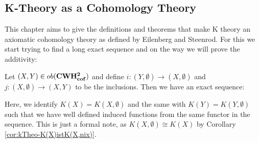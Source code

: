 \subsection{K-Theory as a Cohomology Theory}
This chapter aims to give the definitions and theorems that make K theory an axiomatic cohomology theory as defined by Eilenberg and Steenrod.
For this we start trying to find a long exact sequence and on the way we will prove the additivity:

\begin{lemma} \label{lem:kTheo-exactShortPartForThePair}
	Let $(X,Y)\in ob(\operatorname{\mathbf{CWH^{2}_{cof}}})$ and define $i:(Y,\emptyset) \to (X,\emptyset)$ and $j:(X,\emptyset)\to(X,Y)$ to be the inclusions. Then we have an exact sequence:
	\begin{center}
	\end{center}
	Here, we identify $K(X)=K(X,\emptyset)$ and the same with $K(Y)=K(Y,\emptyset)$ such that we have well defined induced functions from the same functor in the sequence. This is just a formal note, as $K(X,\emptyset)\cong K(X)$ by Corollary \ref{cor:kTheo-K(X)istK(X,nix)}.
\end{lemma}
